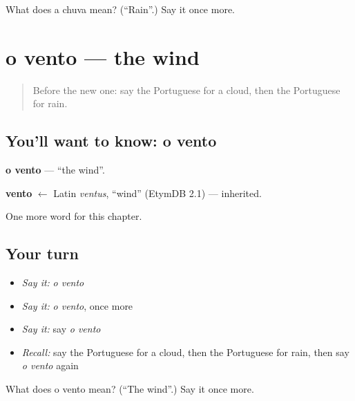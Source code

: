 \begin{tcolorbox}[breakable,colback=teal!4,colframe=teal!35!black,title={Before you move on}]
What does a chuva mean? (\textquotedblleft{}Rain\textquotedblright{}.) Say it once more.
\end{tcolorbox}
\section[o vento]{o vento — the wind}

\label{lesson:PT-C59-vento}



\begin{quote}
Before the new one: say the Portuguese for a cloud, then the Portuguese for rain.
\end{quote}

\subsection*{You'll want to know: o vento}
\textbf{o vento} — \textquotedblleft{}the wind\textquotedblright{}.

\begin{cousinweb}
\textbf{vento} $\leftarrow$ Latin \emph{ventus}, \textquotedblleft{}wind\textquotedblright{} (EtymDB 2.1) — inherited.
\end{cousinweb}

\begin{grammarlens}[title={What you've built}]
One more word for this chapter.
\end{grammarlens}

\subsection*{Your turn}
\begin{itemize}
\raggedright
  \item \emph{Say it:} \emph{o vento}
  \item \emph{Say it:} \emph{o vento}, once more
  \item \emph{Say it:} say \emph{o vento}
  \item \emph{Recall:} say the Portuguese for a cloud, then the Portuguese for rain, then say \emph{o vento} again
\end{itemize}

\begin{tcolorbox}[breakable,colback=teal!4,colframe=teal!35!black,title={Before you move on}]
What does o vento mean? (\textquotedblleft{}The wind\textquotedblright{}.) Say it once more.
\end{tcolorbox}
